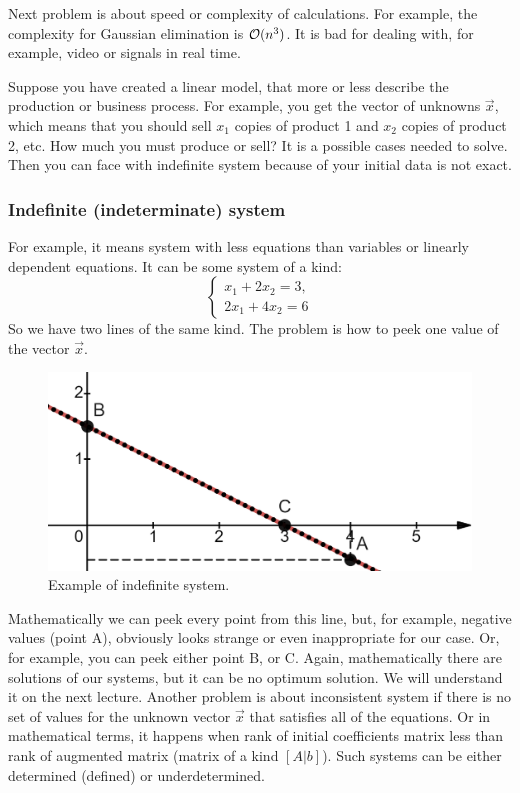     \par
    Next problem is about speed or complexity of calculations. For example, the complexity for Gaussian elimination is ${\cal O}(n^3)$. It is bad for dealing with, for example, video or signals in real time. 
    \par 
    Suppose you have created a linear model, that more or less describe the production or business process. For example, you get the vector of unknowns $\vec{x}$, which means that you should sell $x_1$ copies of product 1 and $x_2$ copies of product 2, etc. How much you must produce or sell? It is a possible cases needed to solve. Then you can face with indefinite system because of your initial data is not exact.
    \subsubsection*{Indefinite (indeterminate) system}
    For example, it means system with less equations than variables or linearly dependent equations. It can be some system of a kind:
    \[
        \left\{ \begin{array}{c}
            x_1 + 2x_2 = 3,\\
            2x_1 + 4x_2 = 6
        \end{array}
            \right.  
    \]
    So we have two lines of the same kind. The problem is how to peek one value of the vector $\vec{x}$. 
    \begin{figure}
        \includegraphics[height=0.25\columnwidth, width=0.4\columnwidth]{lectures/images/indefinite_system.png}
        \caption*{\scriptsize{Example of indefinite system.}}
        \label{fig:indefinite_system}
    \end{figure}
    Mathematically we can peek every point from this line, but, for example, negative values (point A), obviously looks strange or even inappropriate for our case. Or, for example, you can peek either point B, or C. Again, mathematically there are solutions of our systems, but it can be no optimum solution. We will understand it on the next lecture. Another problem is about inconsistent system if there is no set of values for the unknown vector $\vec{x}$ that satisfies all of the equations. Or in mathematical terms, it happens when rank of initial coefficients matrix less than rank of augmented matrix (matrix of a kind $[A|b]$). Such systems can be either determined (defined) or underdetermined.
